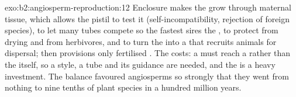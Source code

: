 \begin{solution}{exo:b2:angiosperm-reproduction:12}
Enclosure makes the  grow through maternal tissue, which
allows the pistil to test it (self-incompatibility, rejection of
foreign species), to let many tubes compete so the fastest sires the
, to protect  from drying and from herbivores, and to turn
the  into a  that recruits animals for dispersal;  then provisions only fertilised . The costs: a
 must reach a  rather than the  itself, so a
style, a tube and its guidance are needed, and the  is a heavy
investment. The balance favoured angiosperms so strongly that they
went from nothing to nine tenths of plant species in a hundred
million years.
\end{solution}


